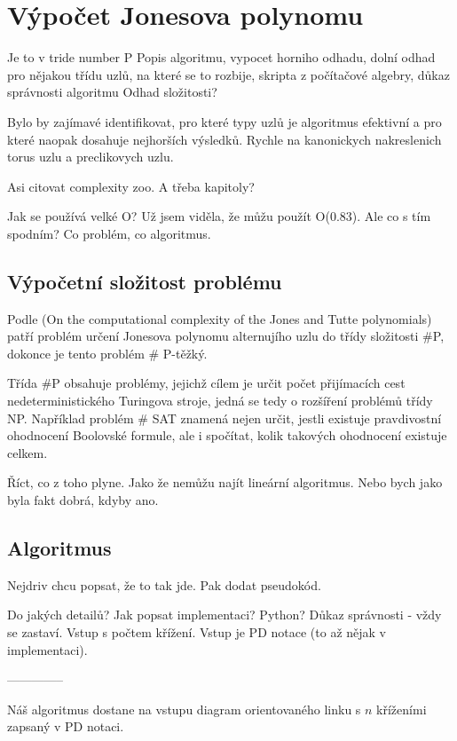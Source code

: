 \chapter{Výpočet Jonesova polynomu}


Je to v tride number P  
Popis algoritmu, vypocet horniho odhadu, dolní odhad pro nějakou třídu uzlů, na které se to rozbije, skripta z počítačové algebry, důkaz správnosti algoritmu
Odhad složitosti?


Bylo by zajímavé identifikovat, pro které typy uzlů je algoritmus efektivní a pro které naopak dosahuje nejhorších výsledků.
Rychle na kanonickych nakreslenich torus uzlu a preclikovych uzlu.

Asi citovat complexity zoo.
A třeba kapitoly?

Jak se používá velké O?
Už jsem viděla, že můžu použít O(0.83). Ale co s tím spodním?
Co problém, co algoritmus.

\section{Výpočetní složitost problému}

Podle (On the computational complexity of the Jones and Tutte polynomials) patří problém určení Jonesova polynomu alternujího uzlu do třídy složitosti \#P, dokonce je tento problém \# P-těžký. 

Třída \#P obsahuje problémy, jejichž cílem je určit počet přijímacích cest nedeterministického Turingova stroje, jedná se tedy o rozšíření problémů třídy NP. Například problém \# SAT znamená nejen určit, jestli existuje pravdivostní ohodnocení Boolovské formule, ale i spočítat, kolik takových ohodnocení existuje celkem.

Říct, co z toho plyne. Jako že nemůžu najít lineární algoritmus. Nebo bych jako byla fakt dobrá, kdyby ano.

\section{Algoritmus}
Nejdriv chcu popsat, že to tak jde. Pak dodat pseudokód.

Do jakých detailů? Jak popsat implementaci? Python? Důkaz správnosti - vždy se zastaví. Vstup s počtem křížení. Vstup je PD notace (to až nějak v implementaci).

--------------

Náš algoritmus dostane na vstupu diagram orientovaného linku s $n$ kříženími zapsaný v PD notaci.

